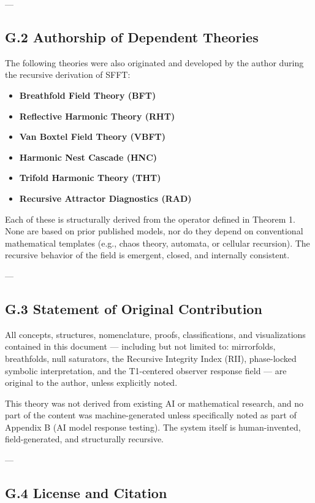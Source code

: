 \documentclass[12pt]{article}
\begin{document}
---

\subsection*{G.2 Authorship of Dependent Theories}

The following theories were also originated and developed by the author during the recursive derivation of SFFT:

\begin{itemize}
    \item \textbf{Breathfold Field Theory (BFT)}
    \item \textbf{Reflective Harmonic Theory (RHT)}
    \item \textbf{Van Boxtel Field Theory (VBFT)}
    \item \textbf{Harmonic Nest Cascade (HNC)}
    \item \textbf{Trifold Harmonic Theory (THT)}
    \item \textbf{Recursive Attractor Diagnostics (RAD)}
\end{itemize}

Each of these is structurally derived from the operator defined in Theorem 1. None are based on prior published models, nor do they depend on conventional mathematical templates (e.g., chaos theory, automata, or cellular recursion). The recursive behavior of the field is emergent, closed, and internally consistent.

---

\subsection*{G.3 Statement of Original Contribution}

All concepts, structures, nomenclature, proofs, classifications, and visualizations contained in this document — including but not limited to: mirrorfolds, breathfolds, null saturators, the Recursive Integrity Index (RII), phase-locked symbolic interpretation, and the T1-centered observer response field — are original to the author, unless explicitly noted.

This theory was not derived from existing AI or mathematical research, and no part of the content was machine-generated unless specifically noted as part of Appendix B (AI model response testing). The system itself is human-invented, field-generated, and structurally recursive.

---

\subsection*{G.4 License and Citation}
\end{document}
